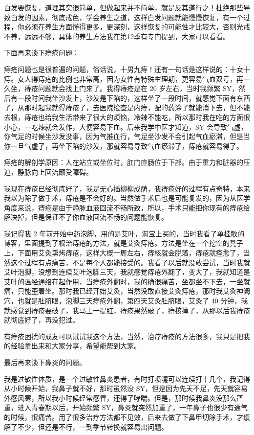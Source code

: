 \documentclass{ctexart}
\begin{document}
白发要恢复，道理其实很简单，但做起来并不简单，就是反其道行之！杜绝那些导致白发的因素，彻底戒色，学会养生之道，这样白发问题就能慢慢恢复，有一个过程，你必须在养生方面懂得更多，更深刻，这样恢复的可能性才比较大，否则光戒不养，远远不够，具体的养生方法我在第12季有专门提到，大家可以看看。

下面再来谈下痔疮问题：

痔疮问题也是很普遍的问题，俗话说，十男九痔！还有一句话是这样说的：十女十痔。女人得痔疮的比例也非常高，因为女性有特殊生理期，更容易气血双亏，再一久坐，痔疮问题就会找上门来了。我得痔疮是在 20 岁左右，当时我频繁 SY，然后有一段时间我坐沙发上，沙发是下陷的，这样坐了一段时间，就感觉下面有东西了，从那时起我就得痔疮了，去医院检查是内痔，配的药涂了就能消下去，但不能去根，痔疮也给我生活带来了很大的烦恼，冷辣不能吃，所以那时我在吃的方面很小心，一吃辣就会发作，大便容易下血。后来我学中医才知道，SY 会导致气虚，你气足的时候坐沙发没事，因为气推血行，气足坐沙发不会引起气血瘀滞，但是当你一旦气虚了，再坐下陷的沙发，那就容易导致气血瘀滞了，痔疮就容易得了。

痔疮的解剖学原因：人在站立或坐位时，肛门直肠位于下部。由于重力和脏器的压迫，静脉向上回流颇受障碍。

我现在痔疮已经彻底好了，我是无心插柳柳成荫，我痔疮好的过程有点奇特，本来我以为除了做手术，痔疮是不会好的。当然做手术后也是可能复发的，因为从医学角度来说，痔疮是由于静脉血液回流不畅所致，所以，手术只能把你现有的痔疮给解决掉，但是保证不了你血液回流不畅的问题能恢复。

我记得我 2 年前开始中药泡脚，用的是艾叶，淘宝上买的，当时我看了单桂敏的博客，里面提到了根治痔疮的方法，就是艾灸痔疮。方法是坐在一个挖空的凳子上，下面用艾灸熏烤痔疮，这样大概一周左右，痔核就会脱落，痔疮就痊愈了，当然这个过程有点痛苦，不是每个人都能接受的。我看了以后就没敢尝试，当时我就艾叶泡脚，没想到连续艾叶泡脚三天，我就感觉痔疮外翻了，变大了，我就知道是艾叶的温经通络在起作用，当痔疮外翻时，我的确很痛苦，坐都坐不下去，一坐就痛，只能歪着坐。那时我已经开始艾灸，当然没敢直接艾灸痔疮，那时我艾灸神阙穴，也就是肚脐眼，泡脚三天痔疮外翻，第四天艾灸肚脐眼，艾灸了 40 分钟，我就感觉到痔疮要破了，我马上一提肛，痔疮果然破了，痔核掉了，从那以后我痔疮就彻底好了，再没犯过。

有痔疮困扰的戒友可以试试我这个方法，当然，治疗痔疮的方法很多，我只是把我的经验拿出来和大家分享，希望能帮到大家。

最后再来谈下鼻炎的问题。

我是过敏性体质，是一个过敏性鼻炎患者，有时打喷嚏可以连续打十几个，我记得从小时候开始，我鼻子就不好，那时虽然没 SY，但是因为先天不足，先天就容易外感风寒，所以我小时候经常感冒，还得了哮喘。但是，那时候我鼻炎没那么严重，进入青春期以后，开始频繁 SY，鼻炎就突然加重了，一年鼻子也很少有通气的时候，很痛苦。用了很多治疗方法都不见效，后来去做了下鼻甲切除手术，才缓解了不少，但还是不行，一到季节转换就容易出问题。
\end{document}
